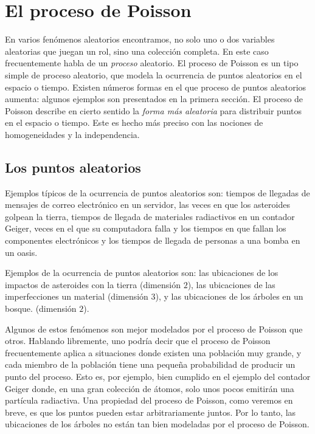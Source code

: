 \documentclass[12pt,a4paper]{kommaexam}
\begin{document}
\chapter{El proceso de Poisson}
\label{chap:1}

En varios fenómenos aleatorios encontramos, no solo uno o dos variables aleatorias que juegan un rol, sino una colección completa. En este caso frecuentemente habla de un \textit{proceso} aleatorio. El proceso de Poisson es un tipo simple de proceso aleatorio, que modela la ocurrencia de puntos aleatorios en el espacio o tiempo. Existen números formas en el que proceso de puntos aleatorios aumenta: algunos ejemplos son presentados en la primera sección. El proceso de Poisson describe en cierto sentido la \textit{forma más aleatoria} para distribuir puntos en el espacio o tiempo. Este es hecho más preciso con las nociones de homogeneidades y la independencia.

\section{Los puntos aleatorios}

Ejemplos típicos de la ocurrencia de puntos aleatorios son: tiempos de llegadas de mensajes de correo electrónico en un servidor, las veces en que los asteroides golpean la tierra, tiempos de llegada de materiales radiactivos en un contador Geiger, veces en el que su computadora falla y los tiempos en que fallan los componentes electrónicos y los tiempos de llegada de personas a una bomba en un oasis.

Ejemplos de la ocurrencia de puntos aleatorios son: las ubicaciones de los impactos de asteroides con la tierra (dimensión $2$), las ubicaciones de las imperfecciones un material (dimensión $3$), y las ubicaciones de los árboles en un bosque. (dimensión $2$).

Algunos de estos fenómenos son mejor modelados por el proceso de Poisson que otros. Hablando libremente, uno podría decir que el proceso de Poisson frecuentemente aplica a situaciones donde existen una población muy grande, y cada miembro de la población tiene una pequeña probabilidad de producir un punto del proceso. Esto es, por ejemplo, bien cumplido en el ejemplo del contador Geiger donde, en una gran colección de átomos, solo unos pocos emitirán una partícula radiactiva. Una propiedad del proceso de Poisson, como veremos en breve, es que los puntos pueden estar arbitrariamente juntos. Por lo tanto, las ubicaciones de los árboles no están tan bien modeladas por el proceso de Poisson.
\end{document}

